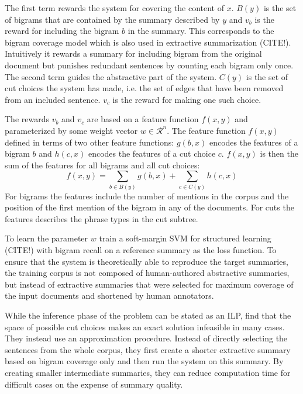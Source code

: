 \documentclass[a4paper,BCOR=10mm]{report}
\numberwithin{lemma}{chapter}
\numberwithin{definition}{chapter}
\begin{document}
The first term rewards the system for covering the content of $x$. $B(y)$ is the set of bigrams that are contained by the summary described by $y$ and $v_b$ is the reward for including the bigram $b$ in the summary. This corresponds to the bigram coverage model which is also used in extractive summarization (CITE!). Intuitively it rewards a summary for including bigram from the original document but punishes redundant sentences by counting each bigram only once.
The second term guides the abstractive part of the system. $C(y)$ is the set of cut choices the system has made, i.e. the set of edges that have been removed from an included sentence. $v_c$ is the reward for making one such choice.

The rewards $v_b$ and $v_c$ are based on a feature function $f(x, y)$ and parameterized by some weight vector $w \in \mathcal{R}^n$.
The feature function $f(x, y)$ defined in terms of two other feature functions: $g(b, x)$ encodes the features of a bigram $b$ and $h(c, x)$ encodes the features of a cut choice $c$. $f(x, y)$ is then the sum of the features for all bigrams and all cut choices:
\begin{equation}
f(x, y) = \sum_{b \in B(y)} g(b, x) + \sum_{c \in C(y)} h(c, x)
\end{equation}
For bigrams the features include the number of mentions in the corpus and the position of the first mention of the bigram in any of the documents.
For cuts the features describes the phrase types in the cut subtree.

To learn the parameter $w$ \citeauthor{berg-kirkpatrick} train a soft-margin SVM for structured learning (CITE!) with bigram recall on a reference summary as the loss function. To ensure that the system is theoretically able to reproduce the target summaries, the training corpus is not composed of human-authored abstractive summaries, but instead of extractive summaries that were selected for maximum coverage of the input documents and shortened by human annotators.

While the inference phase of the problem can be stated as an ILP, \citet{berg-kirkpatrick} find that the space of possible cut choices makes an exact solution infeasible in many cases. They instead use an approximation procedure. Instead of directly selecting the sentences from the whole corpus, they first create a shorter extractive summary based on bigram coverage only and then run the system on this summary. By creating smaller intermediate summaries, they can reduce computation time for difficult cases on the expense of summary quality.
\end{document}
